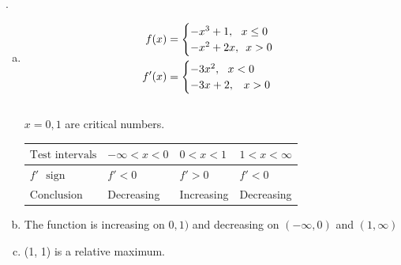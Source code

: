 \documentclass[11pt]{article}
\newcommand*{\vs}{\vspace{1cm}}
\newcommand*{\next}{\noindent}
\newcommand*{\set}{\setcounter{equation}{0}}
\begin{document}
\vs
\next
42.\begin{enumerate}[(a)]
    \item \begin{align}
        \set
        f(x)&=\begin{cases}
            -x^3+1,\,\,\,\, x\leq 0\\
            -x^2+2x,\,\,\, x>0
        \end{cases}\\
        f'(x)&=\begin{cases}
            -3x^2,\,\,\,\, x<0\\
            -3x+2,\,\,\,\ x>0\\
        \end{cases}
    \end{align}\\
    $x=0, 1$ are critical numbers.
    \begin{flushleft}
        \begin{table}[h]
                \begin{tabular}{|l|l|l|l|}
                    \hline
                    $\text{Test intervals}$ & $-\infty<x<0$ & $0<x<1$ & $1<x<\infty$\\ \hline
                    $f'\,\,\,\,\text{sign}$ & $f'<0$ & $f'>0$ & $f'<0$\\ \hline
                    $\text{Conclusion}$ & Decreasing & Increasing & Decreasing\\
                    \hline
             \end{tabular}
            \end{table}
        \end{flushleft}
        \item The function is increasing on $0, 1)$ and decreasing on $(-\infty, 0)$ and $(1, \infty)$
        \item (1, 1) is a relative maximum.
\end{enumerate}
\end{document}
